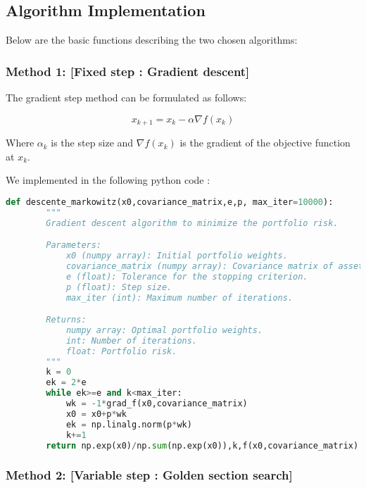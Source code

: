 \documentclass[12pt]{article}
\begin{document}
\subsection*{Algorithm Implementation}

Below are the basic functions describing the two chosen algorithms:

\subsubsection*{Method 1: [Fixed step : Gradient descent]}


The gradient step method can be formulated as follows:

\begin{equation}
    x_{k+1} = x_k - \alpha \nabla f(x_k)
\end{equation}
    
Where $\alpha_k$ is the step size and $\nabla f(x_k)$ is the gradient of the objective function at $x_k$.

We implemented in the following python code :


\begin{lstlisting}[language=Python]
    def descente_markowitz(x0,covariance_matrix,e,p, max_iter=10000):
        """ 
        Gradient descent algorithm to minimize the portfolio risk.

        Parameters:
            x0 (numpy array): Initial portfolio weights.
            covariance_matrix (numpy array): Covariance matrix of asset returns.
            e (float): Tolerance for the stopping criterion.
            p (float): Step size.
            max_iter (int): Maximum number of iterations.

        Returns:
            numpy array: Optimal portfolio weights.
            int: Number of iterations.
            float: Portfolio risk.
        """
        k = 0
        ek = 2*e
        while ek>=e and k<max_iter:
            wk = -1*grad_f(x0,covariance_matrix)
            x0 = x0+p*wk
            ek = np.linalg.norm(p*wk)
            k+=1
        return np.exp(x0)/np.sum(np.exp(x0)),k,f(x0,covariance_matrix)
\end{lstlisting}



\subsubsection*{Method 2: [Variable step : Golden section search]}
\end{document}
